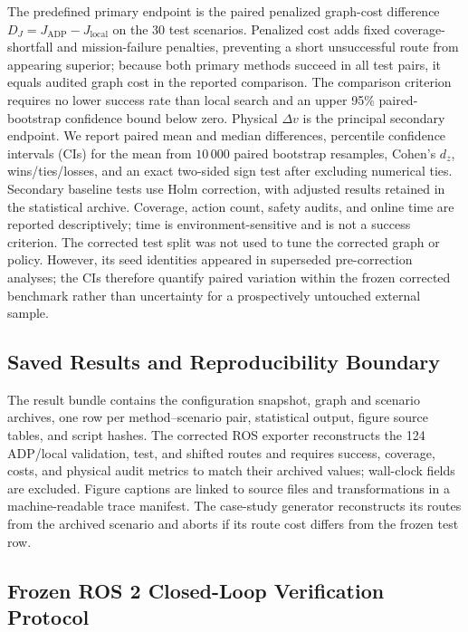 \documentclass{IEEEtaes}
\theoremstyle{remark}
\theoremstyle{plain}
\begin{document}
The predefined primary endpoint is the paired penalized graph-cost difference $D_J=J_{\mathrm{ADP}}-J_{\mathrm{local}}$ on the 30 test scenarios. Penalized cost adds fixed coverage-shortfall and mission-failure penalties, preventing a short unsuccessful route from appearing superior; because both primary methods succeed in all test pairs, it equals audited graph cost in the reported comparison. The comparison criterion requires no lower success rate than local search and an upper 95\% paired-bootstrap confidence bound below zero. Physical $\Delta v$ is the principal secondary endpoint. We report paired mean and median differences, percentile confidence intervals (CIs) for the mean from $10\,000$ paired bootstrap resamples, Cohen's $d_z$, wins/ties/losses, and an exact two-sided sign test after excluding numerical ties. Secondary baseline tests use Holm correction, with adjusted results retained in the statistical archive. Coverage, action count, safety audits, and online time are reported descriptively; time is environment-sensitive and is not a success criterion. The corrected test split was not used to tune the corrected graph or policy. However, its seed identities appeared in superseded pre-correction analyses; the CIs therefore quantify paired variation within the frozen corrected benchmark rather than uncertainty for a prospectively untouched external sample.

\subsection{Saved Results and Reproducibility Boundary}

The result bundle contains the configuration snapshot, graph and scenario archives, one row per method--scenario pair, statistical output, figure source tables, and script hashes. The corrected ROS exporter reconstructs the 124 ADP/local validation, test, and shifted routes and requires success, coverage, costs, and physical audit metrics to match their archived values; wall-clock fields are excluded. Figure captions are linked to source files and transformations in a machine-readable trace manifest. The case-study generator reconstructs its routes from the archived scenario and aborts if its route cost differs from the frozen test row.

\subsection{Frozen ROS 2 Closed-Loop Verification Protocol}
\label{sec:ros-verification-protocol}
\end{document}
